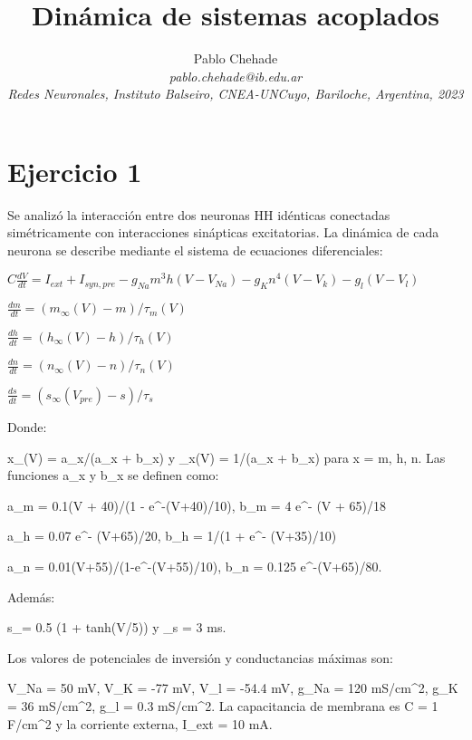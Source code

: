 \documentclass[aps,prb,twocolumn,superscriptaddress,floatfix,longbibliography]{revtex4-2}
\newcounter{para}
\begin{document}
\newcommand{\mytitle}{Dinámica de sistemas acoplados}

\title{\mytitle}

\author{Pablo Chehade \\
    \small \textit{pablo.chehade@ib.edu.ar} \\
    \small \textit{Redes Neuronales, Instituto Balseiro, CNEA-UNCuyo, Bariloche, Argentina, 2023} \\}
    
    
    
\maketitle



\section{Ejercicio 1}
Se analizó la interacción entre dos neuronas HH idénticas conectadas simétricamente con interacciones sinápticas excitatorias. La dinámica de cada neurona se describe mediante el sistema de ecuaciones diferenciales:

$C \frac{dV}{dt} = I_{ext} + I_{syn,pre} - g_{Na}m^3h(V-V_{Na}) - g_{K}n^4(V - V_k) - g_l(V-V_l)$

$\frac{dm}{dt} = (m_\infty(V) - m)/\tau_m(V)$

$\frac{dh}{dt} = (h_\infty(V) - h)/\tau_h(V)$

$\frac{dn}{dt} = (n_\infty(V) - n)/\tau_n(V)$

$\frac{ds}{dt} = (s_\infty(V_{pre}) - s)/\tau_s$

Donde:

x_\infty(V) = a_x/(a_x + b_x) y \tau_x(V) = 1/(a_x + b_x) para x = m, h, n. Las funciones a_x y b_x se definen como:

a_m = 0.1(V + 40)/(1 - e^{-(V+40)/10}), b_m = 4 e^{- (V + 65)/18}

a_h = 0.07 e^{- (V+65)/20}, b_h = 1/(1 + e^{- (V+35)/10})

a_n = 0.01(V+55)/(1-e^{-(V+55)/10}), b_n = 0.125 e^{-(V+65)/80}.

Además:

s_\infty = 0.5 (1 + tanh(V/5)) y \tau_s = 3 ms.

Los valores de potenciales de inversión y conductancias máximas son:

V_{Na} = 50 mV, V_K = -77 mV, V_l = -54.4 mV, g_{Na} = 120 mS/cm^2, g_K = 36 mS/cm^2, g_l = 0.3 mS/cm^2. La capacitancia de membrana es C = 1 \mu F/cm^2 y la corriente externa, I_{ext} = 10 mA.
\end{document}
